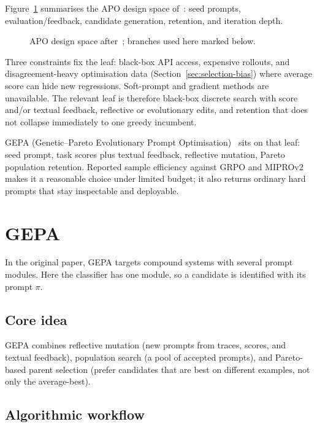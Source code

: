 Figure~\ref{fig:apo-taxonomy} summarises the APO design space of~\cite{ramnath2025survey}: seed prompts, evaluation/feedback, candidate generation, retention, and iteration depth.

\begin{figure}[htbp]
    \centering
    
    \caption[APO design space]{APO design space after~\cite{ramnath2025survey}; branches used here marked below.}
    \label{fig:apo-taxonomy}
\end{figure}

Three constraints fix the leaf: black-box API access, expensive rollouts, and disagreement-heavy optimisation data (Section~\ref{sec:selection-bias}) where average score can hide new regressions. Soft-prompt and gradient methods are unavailable. The relevant leaf is therefore black-box discrete search with score and/or textual feedback, reflective or evolutionary edits, and retention that does not collapse immediately to one greedy incumbent.

GEPA (Genetic--Pareto Evolutionary Prompt Optimisation)~\cite{agrawal2025gepa} sits on that leaf: seed prompt, task scores plus textual feedback, reflective mutation, Pareto population retention. Reported sample efficiency against GRPO and MIPROv2~\cite{opsahlong2024mipro,agrawal2025gepa} makes it a reasonable choice under limited budget; it also returns ordinary hard prompts that stay inspectable and deployable.

\section{GEPA}
\label{sec:gepa}

In the original paper, GEPA targets compound systems with several prompt modules. Here the classifier has one module, so a candidate is identified with its prompt \(\pi\).

\subsection{Core idea}

GEPA combines reflective mutation (new prompts from traces, scores, and textual feedback), population search (a pool of accepted prompts), and Pareto-based parent selection (prefer candidates that are best on different examples, not only the average-best).

\subsection{Algorithmic workflow}

